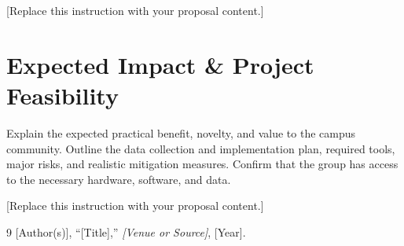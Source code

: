 \documentclass{article}
\begin{document}

[Replace this instruction with your proposal content.]

\section{Expected Impact \& Project Feasibility}
Explain the expected practical benefit, novelty, and value to the campus community. Outline the data collection and implementation plan, required tools, major risks, and realistic mitigation measures. Confirm that the group has access to the necessary hardware, software, and data.

[Replace this instruction with your proposal content.]

\begin{thebibliography}{9}
\small
{}
[Author(s)], ``[Title],'' \emph{[Venue or Source]}, [Year].
\end{thebibliography}

\end{document}
